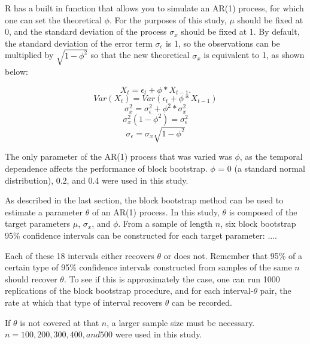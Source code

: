 \documentclass[12pt, letterpaper, titlepage]{article}
\begin{document}

R has a built in function that allows you to simulate an AR(1) process, for which one can set the theoretical $\phi$. For the purposes of this study, $\mu$ should be fixed at 0, and the standard deviation of the process $\sigma_{x}$ should be fixed at 1. By default, the standard deviation of the error term $\sigma_{\epsilon}$ is 1, so the observations can be multiplied by $\sqrt{1 - \phi^2}$ so that the new theoretical $\sigma_{x}$ is equivalent to 1, as shown below:

\[X_{t} = \epsilon_{t} + \phi*X_{t-1}.\]
\[Var(X_{t}) = Var(\epsilon_{t} + \phi*X_{t-1})\]
\[\sigma^2_{x} = \sigma^2_{\epsilon} + \phi^2*\sigma^2_{x}\]
\[\sigma^2_{x}(1 - \phi^2) = \sigma^2_{\epsilon}\]
\[\sigma_{\epsilon} = \sigma_{x}\sqrt{1 - \phi^2}\]

The only parameter of the AR(1) process that was varied was $\phi$, as the temporal dependence affects the performance of block bootstrap. $\phi$ = 0 (a standard normal distribution), 0.2, and 0.4 were used in this study. 

As described in the last section, the block bootstrap method can be used to estimate a parameter $\theta$ of an AR(1) process. In this study, $\theta$ is composed of the target parameters $\mu$, $\sigma_{x}$, and $\phi$. From a sample of length $n$, six block bootstrap 95\% confidence intervals can be constructed for each target parameter: ....

Each of these 18 intervals either recovers $\theta$ or does not. Remember that 95\% of a certain type of 95\% confidence intervals constructed from samples of the same $n$ should recover $\theta$. To see if this is approximately the case, one can run 1000 replications of the block bootstrap procedure, and for each interval-$\theta$ pair, the rate at which that type of interval recovers $\theta$ can be recorded.


If $\theta$ is not covered at that $n$, a larger sample size must be necessary. $n = 100, 200, 300, 400, and 500$ were used in this study. 
\end{document}
